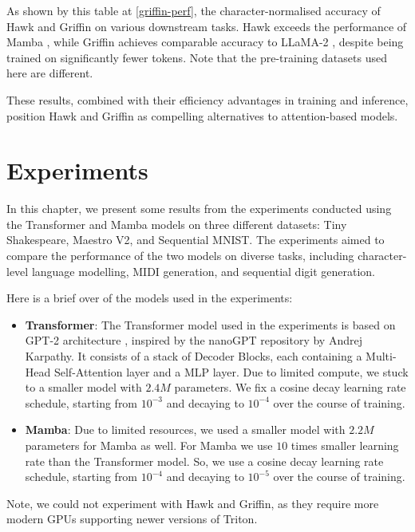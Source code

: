 \documentclass[12pt,a4paper]{report}
\begin{document}
As shown by this table at \ref{griffin-perf}, the character-normalised accuracy of Hawk and Griffin on various downstream tasks. Hawk exceeds the performance of Mamba \cite{mamba}, while Griffin achieves comparable accuracy to LLaMA-2 \cite{llama2}, despite being trained on significantly fewer tokens. Note that the pre-training datasets used here are different.

\medskip

These results, combined with their efficiency advantages in training and inference, position Hawk and Griffin as compelling alternatives to attention-based models.

\chapter{Experiments}

In this chapter, we present some results from the experiments conducted using the Transformer and Mamba models on three different datasets: Tiny Shakespeare, Maestro V2, and Sequential MNIST. The experiments aimed to compare the performance of the two models on diverse tasks, including character-level language modelling, MIDI generation, and sequential digit generation.

\medskip

Here is a brief over of the models used in the experiments:
\begin{itemize}
    \item \textbf{Transformer}: The Transformer model used in the experiments is based on GPT-2 architecture \cite{gpt2}, inspired by the nanoGPT repository by Andrej Karpathy. It consists of a stack of Decoder Blocks, each containing a Multi-Head Self-Attention layer and a MLP layer. Due to limited compute, we stuck to a smaller model with $2.4M$ parameters. We fix a cosine decay learning rate schedule, starting from $10^{-3}$ and decaying to $10^{-4}$ over the course of training.
    \item \textbf{Mamba}: Due to limited resources, we used a smaller model with $2.2M$ parameters for Mamba as well. For Mamba we use $10$ times smaller learning rate than the Transformer model. So, we use a cosine decay learning rate schedule, starting from $10^{-4}$ and decaying to $10^{-5}$ over the course of training.
\end{itemize}

Note, we could not experiment with Hawk and Griffin, as they require more modern GPUs supporting newer versions of Triton.
\end{document}
